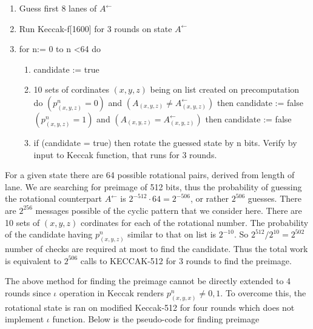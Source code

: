 \begin{enumerate}
\item Guess first 8 lanes of $A^{\leftarrow}$
\item Run Keccak-f[1600] for 3 rounds on state $A^{\leftarrow}$
\item for n:= 0 to n \textless 64 do
  \begin{enumerate}
  \item candidate := true
  \item 10 sets of cordinates $(x, y, z)$ being on list created on precomputation do
  \newline $(p^n_{(x, y, z)} = 0)$ and $(A_{(x, y, z)} \neq A^{\leftarrow}_{(x, y, z)})$ then candidate := false
  \newline $(p^n_{(x, y, z)} = 1)$ and $(A_{(x, y, z)} = A^{\leftarrow}_{(x, y, z)})$ then candidate := false
  \item if (candidate = true) then rotate the guessed state by n bits. Verify by input to Keccak function, that
  runs for 3 rounds.
  \end{enumerate}
\end{enumerate}

For a given state there are 64 possible rotational pairs, derived from length of lane. We are searching for preimage
of 512 bits, thus the probability of guessing the rotational counterpart $A^{\leftarrow}$ is $2^{-512} \cdot 64 = 2^{-506}$,
or rather $2^{506}$ guesses. There are $2^{256}$ messages possible of the cyclic pattern that we consider here. There
are 10 sets of $(x, y, z)$ cordinates for each of the rotational number. The probability of the candidate having 
$p^n_{(x, y, z)}$ similar to that on list is $2^{-10}$. So $2^{512} / 2^{10} = 2^{502}$ number of checks are required
at most to find the candidate. Thus the total work is equivalent to $2^{506}$ calls to KECCAK-512 for 3 rounds to find
the preimage.

The above method for finding the preimage cannot be directly extended to 4 rounds since $\iota$ operation in Keccak
renders $p^n_{(x, y, x)} \neq 0, 1$. To overcome this, the rotational state is ran on modified Keccak-512 for four rounds
which does not implement $\iota$ function. Below is the pseudo-code for finding preimage \cite{00022}

